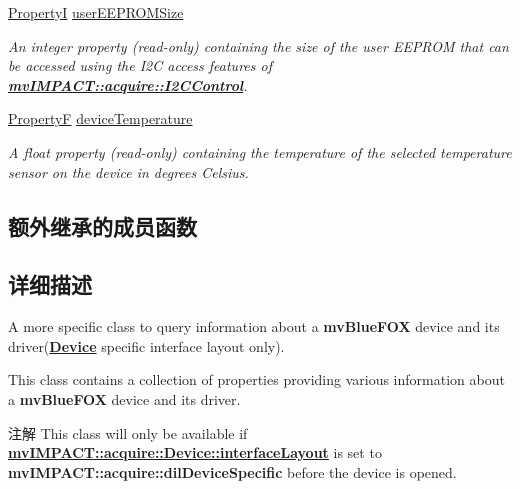 \begin{DoxyCompactItemize}
\hyperlink{group___common_interface_ga12d5e434238ca242a1ba4c6c3ea45780}{Property\+I} \hyperlink{classmv_i_m_p_a_c_t_1_1acquire_1_1_info_blue_f_o_x_a57fce60a1a0f1890efd1b4515a2fced4}{user\+E\+E\+P\+R\+O\+M\+Size}
\begin{DoxyCompactList}\small\item\em An integer property {\bfseries }(read-\/only) containing the size of the user E\+E\+P\+R\+O\+M that can be accessed using the I2\+C access features of {\bfseries \hyperlink{classmv_i_m_p_a_c_t_1_1acquire_1_1_i2_c_control}{mv\+I\+M\+P\+A\+C\+T\+::acquire\+::\+I2\+C\+Control}}. \end{DoxyCompactList}\item 
\hyperlink{group___common_interface_gaf54865fe5a3d5cfd15f9a111b40d09f9}{Property\+F} \hyperlink{classmv_i_m_p_a_c_t_1_1acquire_1_1_info_blue_f_o_x_abb564f09fadeb6f34ed442ff12c1f4ea}{device\+Temperature}
\begin{DoxyCompactList}\small\item\em A float property {\bfseries }(read-\/only) containing the temperature of the selected temperature sensor on the device in degrees Celsius. \end{DoxyCompactList}\end{DoxyCompactItemize}
\subsection*{额外继承的成员函数}


\subsection{详细描述}
A more specific class to query information about a {\bfseries mv\+Blue\+F\+O\+X} device and its driver({\bfseries \hyperlink{classmv_i_m_p_a_c_t_1_1acquire_1_1_device}{Device}} specific interface layout only). 

This class contains a collection of properties providing various information about a {\bfseries mv\+Blue\+F\+O\+X} device and its driver.

\begin{DoxyNote}{注解}
This class will only be available if {\bfseries \hyperlink{classmv_i_m_p_a_c_t_1_1acquire_1_1_device_ab4dd0ecc9d456bb5ddc01d844c9d6f2d}{mv\+I\+M\+P\+A\+C\+T\+::acquire\+::\+Device\+::interface\+Layout}} is set to {\bfseries mv\+I\+M\+P\+A\+C\+T\+::acquire\+::dil\+Device\+Specific} before the device is opened. 
\end{DoxyNote}


